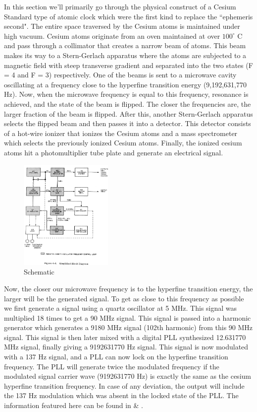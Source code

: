 \documentclass[%
 aapm,
 mph,%
 amsmath,amssymb,
 reprint,%
]{revtex4-2}
\begin{document}
In this section we'll primarily go through the physical construct of a Cesium Standard type of atomic clock which were the first kind to replace the ``ephemeris second".
The entire space traversed by the Cesium atoms is maintained under high vacuum. Cesium atoms originate from an oven maintained at over
$100^\circ$ C and pass through a collimator that creates a narrow beam of atoms. This beam makes its way to a Stern-Gerlach apparatus where 
the atoms are subjected to a magnetic field with steep transverse gradient and separated into the two states (F = 4 and 
F = 3) respectively. One of the beams is sent to a microwave cavity oscillating at a frequency close to the hyperfine transition energy (9,192,631,770 Hz).
Now, when the microwave frequency is equal to this frequency, resonance is achieved, and the state of the beam is flipped.
The closer the frequencies are, the larger fraction of the beam is flipped. After this, another Stern-Gerlach apparatus selects the flipped beam and then
passes it into a detector. This detector consists of a hot-wire ionizer that ionizes the Cesium atoms and a mass spectrometer which 
selects the previously ionized Cesium atoms. Finally, the ionized cesium atoms hit a photomultiplier tube plate and generate an electrical signal.

\begin{figure}
    \centering
    \includegraphics[width = 0.4\textwidth]{device.png}
    \caption{Schematic \cite{hpclock}}
\end{figure}

Now, the closer our microwave frequency is to the hyperfine transition energy, the larger will be the generated signal. To get as close to this
frequency as possible we first generate a signal using a quartz oscillator at 5 MHz. This signal was multiplied 18 times to get
a 90 MHz signal. This signal is passed into a harmonic generator which generates a 9180 MHz signal (102th harmonic) from this 90 MHz signal. This signal
is then later mixed with a digital PLL synthesized 12.631770 MHz signal, finally giving a 9192631770 Hz signal. This signal is now modulated with
a 137 Hz signal, and a PLL can now lock on the hyperfine transition frequency. The PLL will generate twice the modulated frequency if the modulated signal carrier wave (9192631770 Hz) is exactly the same as the cesium hyperfine transition frequency. In case of any deviation, the output will include the 137 Hz modulation which was
absent in the locked state of the PLL. The information featured here can be found in \cite{hpclock} \& \cite{major2013quantum}.
\end{document}
